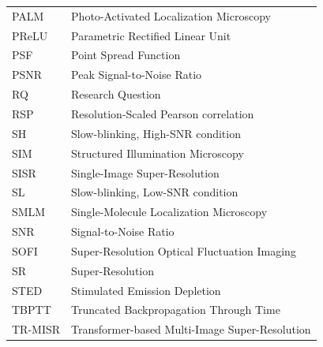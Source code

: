 \begin{longtable}{p{2.8cm}p{11cm}}
    PALM      & Photo-Activated Localization Microscopy \\
    PReLU     & Parametric Rectified Linear Unit \\
    PSF       & Point Spread Function \\
    PSNR      & Peak Signal-to-Noise Ratio \\
    RQ        & Research Question \\
    RSP       & Resolution-Scaled Pearson correlation \\
    SH        & Slow-blinking, High-SNR condition \\
    SIM       & Structured Illumination Microscopy \\
    SISR      & Single-Image Super-Resolution \\
    SL        & Slow-blinking, Low-SNR condition \\
    SMLM      & Single-Molecule Localization Microscopy \\
    SNR       & Signal-to-Noise Ratio \\
    SOFI      & Super-Resolution Optical Fluctuation Imaging \\
    SR        & Super-Resolution \\
    STED      & Stimulated Emission Depletion \\
    TBPTT     & Truncated Backpropagation Through Time \\
    TR-MISR   & Transformer-based Multi-Image Super-Resolution \\
    \bottomrule
\end{longtable}
